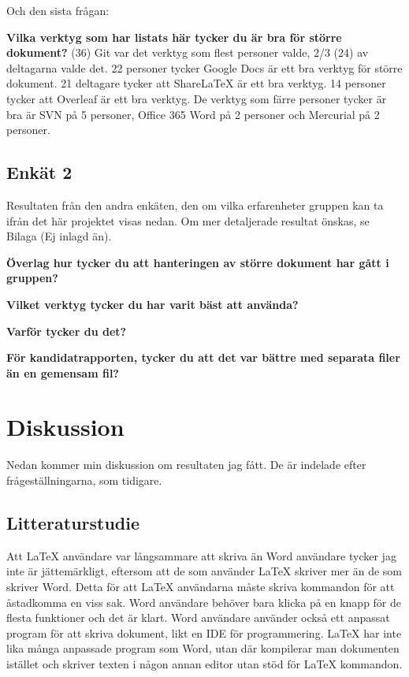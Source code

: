Och den sista frågan:

\textbf{Vilka verktyg som har listats här tycker du är bra för större dokument?} (36)
Git var det verktyg som flest personer valde, 2/3 (24) av deltagarna valde det. 22 personer tycker Google Docs är ett bra verktyg för större dokument. 21 deltagare tycker att ShareLaTeX är ett bra verktyg. 14 personer tycker att Overleaf är ett bra verktyg. De verktyg som färre personer tycker är bra är SVN på 5 personer, Office 365 Word på 2 personer och Mercurial på 2 personer.

\subsection{Enkät 2}
Resultaten från den andra enkäten, den om vilka erfarenheter gruppen kan ta ifrån det här projektet visas nedan. Om mer detaljerade resultat önskas, se Bilaga (Ej inlagd än).

\textbf{Överlag hur tycker du att hanteringen av större dokument har gått i gruppen?}

\textbf{Vilket verktyg tycker du har varit bäst att använda?}

\textbf{Varför tycker du det?}

\textbf{För kandidatrapporten, tycker du att det var bättre med separata filer än en gemensam fil?}

\section{Diskussion}
\label{sec:discussion-tuhkala}
Nedan kommer min diskussion om resultaten jag fått. De är indelade efter frågeställningarna, som tidigare.

\subsection{Litteraturstudie}
Att LaTeX användare var långsammare att skriva än Word användare tycker jag inte är jättemärkligt, eftersom att de som använder LaTeX skriver mer än de som skriver Word. Detta för att LaTeX användarna måste skriva kommandon för att åstadkomma en viss sak. Word användare behöver bara klicka på en knapp för de flesta funktioner och det är klart. Word användare använder också ett anpassat program för att skriva dokument, likt en IDE för programmering. LaTeX har inte lika många anpassade program som Word, utan där kompilerar man dokumenten istället och skriver texten i någon annan editor utan stöd för LaTeX kommandon.

